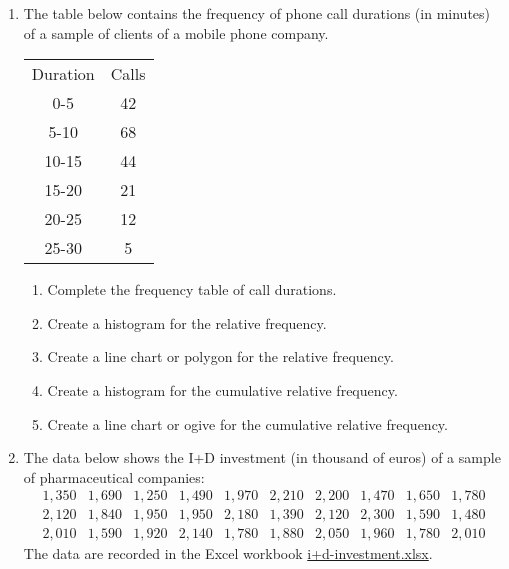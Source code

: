 \begin{enumerate}[leftmargin=*,resume]
\item\label{phone-call-duration} The table below contains the frequency of phone call durations (in minutes) of a sample
of clients of a mobile phone company.
\begin{center}
\begin{tabular}{cc}
\toprule
Duration & Calls\\
0-5 & 42\\
5-10 & 68\\
10-15 & 44\\
15-20 & 21\\
20-25 & 12\\
25-30 & 5\\
\bottomrule
\end{tabular}
\end{center}
\begin{enumerate}
\item Complete the frequency table of call durations. 
\item Create a histogram for the relative frequency.
\item Create a line chart or polygon for the relative frequency. 
\item Create a histogram for the cumulative relative frequency. 
\item Create a line chart or ogive for the cumulative relative frequency. 
\end{enumerate}


\item\label{i+d-investment} The data below shows the I+D investment (in thousand of euros) of a sample of pharmaceutical companies:
\[
\begin{array}{rrrrrrrrrr}
1,350 & 1,690 & 1,250 & 1,490 & 1,970 & 2,210 & 2,200 & 1,470 & 1,650 & 1,780 \\
2,120 & 1,840 & 1,950 & 1,950 & 2,180 & 1,390 & 2,120 & 2,300 & 1,590 & 1,480 \\
2,010 & 1,590 & 1,920 & 2,140 & 1,780 & 1,880 & 2,050 & 1,960 & 1,780 & 2,010 
\end{array}
\]
The data are recorded in the Excel workbook \href{http://aprendeconalf.es/office/excel/exercises/descriptive-statistics/i+d-investment.xlsx}{\textsf{i+d-investment.xlsx}}.


\end{enumerate}
